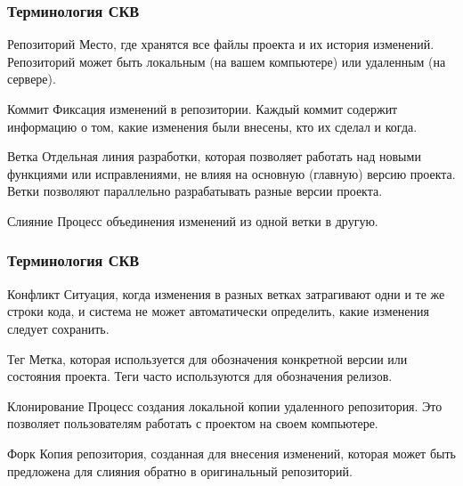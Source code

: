 \documentclass[aspectratio=169]{beamer}
\begin{document}
\begin{frame}
\frametitle{Терминология СКВ}
\begin{alertblock}{Репозиторий}
Место, где хранятся все файлы проекта и их история изменений. Репозиторий может быть локальным (на вашем компьютере) или удаленным (на сервере).
\end{alertblock}
\begin{alertblock}{Коммит}
Фиксация изменений в репозитории. Каждый коммит содержит информацию о том, какие изменения были внесены, кто их сделал и когда.
\end{alertblock}
\begin{alertblock}{Ветка}
Отдельная линия разработки, которая позволяет работать над новыми функциями или исправлениями, не влияя на основную (главную) версию проекта. Ветки позволяют параллельно разрабатывать разные версии проекта.
\end{alertblock}
\begin{alertblock}{Слияние}
Процесс объединения изменений из одной ветки в другую.
\end{alertblock}
\end{frame}

\begin{frame}
\frametitle{Терминология СКВ}
\begin{alertblock}{Конфликт}
Ситуация, когда изменения в разных ветках затрагивают одни и те же строки кода, и система не может автоматически определить, какие изменения следует сохранить.
\end{alertblock}
\begin{alertblock}{Тег}
Метка, которая используется для обозначения конкретной версии или состояния проекта. Теги часто используются для обозначения релизов.
\end{alertblock}
\begin{alertblock}{Клонирование}
Процесс создания локальной копии удаленного репозитория. Это позволяет пользователям работать с проектом на своем компьютере.
\end{alertblock}
\begin{alertblock}{Форк}
Копия репозитория, созданная для внесения изменений, которая может быть предложена для слияния обратно в оригинальный репозиторий.
\end{alertblock}
\end{frame}
\end{document}
